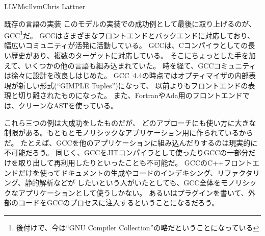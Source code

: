\begin{aosachapter}{LLVM}{s:llvm}{Chris Lattner}
\begin{aosasect1}{既存の言語の実装}
このモデルの実装での成功例として最後に取り上げるのが、GCC\footnote{後付けで、今は``GNU Compiler Collection''の略だということになっている}だ。
GCCはさまざまなフロントエンドとバックエンドに対応しており、幅広いコミュニティが活発に活動している。
GCCは、Cコンパイラとしての長い歴史があり、複数のターゲットに対応している。
そこにちょっとした手を加えて、いくつかの他の言語も組み込まれていた。
時を経て、GCCコミュニティは徐々に設計を改良しはじめた。
GCC~4.4の時点ではオプティマイザの内部表現が新しい形式(``GIMPLE Tuples'')になって、
以前よりもフロントエンドの表現と切り離されたものになった。
また、FortranやAda用のフロントエンドでは、クリーンなASTを使っている。

これら三つの例は大成功をしたものだが、
どのアプローチにも使い方に大きな制限がある。もともとモノリシックなアプリケーション用に作られているからだ。
たとえば、GCCを他のアプリケーションに組み込んだりするのは現実的に不可能だろう。
同じく、GCCをJITコンパイラとして使ったりGCCの一部分だけを取り出して再利用したりといったことも不可能だ。
GCCのC++フロントエンドだけを使ってドキュメントの生成やコードのインデキシング、リファクタリング、静的解析などが
したいという人がいたとしても、GCC全体をモノリシックなアプリケーションとして使うしかない。
あるいはプラグインを書いて、外部のコードをGCCのプロセスに注入するということになるだろう。


\end{aosasect1}
\end{aosachapter}
